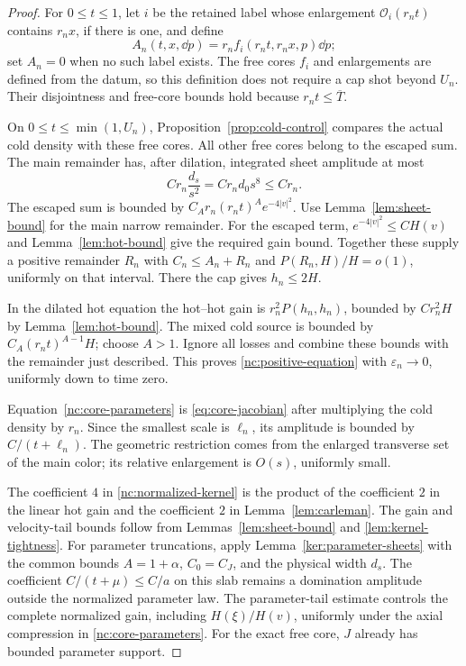 \begin{proof}
For \(0\le t\le1\), let \(i\) be the retained label whose enlargement
\(\mathcal O_i(r_nt)\) contains \(r_nx\), if there is one, and define
\[
 A_n(t,x,\dd p)=r_n f_i(r_nt,r_nx,p)\dd p;
\]
set \(A_n=0\) when no such label exists. The free cores \(f_i\) and
enlargements are defined from the datum, so this definition does not
require a cap shot beyond \(U_n\). Their disjointness and free-core
bounds hold because \(r_nt\le\overline T\).

On \(0\le t\le\min(1,U_n)\), Proposition~\ref{prop:cold-control}
compares the actual cold density with these free cores. All other free
cores belong to the escaped sum. The main remainder has, after dilation,
integrated sheet amplitude at most
\[
 C r_n\frac{d_s}{s^2}=C r_nd_0s^8\le C r_n .
\]
The escaped sum is bounded by
\(C_A r_n(r_nt)^A e^{-4|v|^2}\).
Use Lemma~\ref{lem:sheet-bound} for the main narrow remainder.
For the escaped term, \(e^{-4|v|^2}\le CH(v)\) and
Lemma~\ref{lem:hot-bound} give the required gain bound.
Together these supply a positive remainder \(R_n\) with
\(C_n\le A_n+R_n\) and \(P(R_n,H)/H=o(1)\), uniformly on that
interval. There the cap gives \(h_n\le2H\).

In the dilated hot equation the hot--hot gain is
\(r_n^2P(h_n,h_n)\), bounded by \(Cr_n^2H\) by
Lemma~\ref{lem:hot-bound}.  The mixed cold source is bounded by
\(C_A(r_nt)^{A-1}H\); choose \(A>1\).  Ignore all losses and combine
these bounds with the remainder just described.  This proves
\eqref{nc:positive-equation} with \(\varepsilon_n\to0\), uniformly
down to time zero.

Equation~\eqref{nc:core-parameters} is
\eqref{eq:core-jacobian} after multiplying the cold density by \(r_n\).
Since the smallest scale is \(\ell_n\), its amplitude is bounded by
\(C/(t+\ell_n)\).  The geometric restriction comes from the enlarged
transverse set of the main color; its relative enlargement is
\(O(s)\), uniformly small.

The coefficient \(4\) in \eqref{nc:normalized-kernel} is the product
of the coefficient \(2\) in the linear hot gain and the coefficient
\(2\) in Lemma~\ref{lem:carleman}. The gain and velocity-tail bounds
follow from Lemmas~\ref{lem:sheet-bound} and \ref{lem:kernel-tightness}.
For parameter truncations, apply Lemma~\ref{ker:parameter-sheets}
with the common bounds \(A=1+\alpha\), \(C_0=C_J\), and the physical
width \(d_s\). The coefficient \(C/(t+\mu)\le C/a\) on this slab
remains a domination amplitude outside the normalized parameter law.
The parameter-tail estimate controls the complete normalized gain,
including \(H(\xi)/H(v)\), uniformly under the axial compression in
\eqref{nc:core-parameters}. For the exact free core, \(J\) already
has bounded parameter support.
\end{proof}

